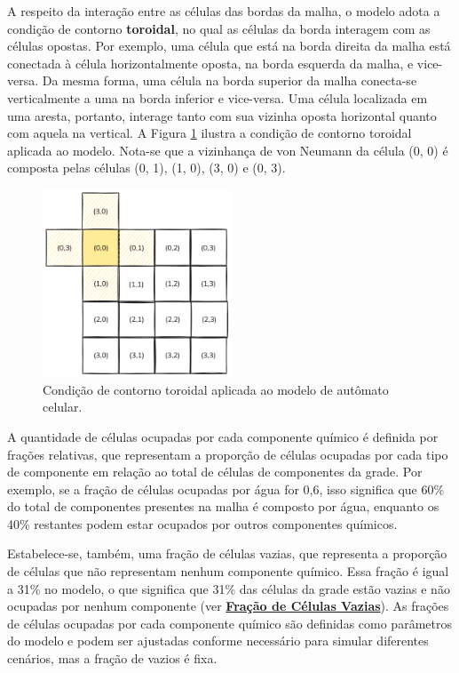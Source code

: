 \documentclass[12pt,oneside]{report}
\begin{document}
A respeito da interação entre as células das bordas da malha, o modelo adota a condição de contorno \textbf{toroidal}, no qual as células da borda interagem com as células opostas. Por exemplo, uma célula que está na borda direita da malha está conectada à célula horizontalmente oposta, na borda esquerda da malha, e vice-versa. Da mesma forma, uma célula na borda superior da malha conecta-se verticalmente a uma na borda inferior e vice-versa. Uma célula localizada em uma aresta, portanto, interage tanto com sua vizinha oposta horizontal quanto com aquela na vertical. A Figura \ref{fig:torus} ilustra a condição de contorno toroidal aplicada ao modelo. Nota-se que a vizinhança de von Neumann da célula (0, 0) é composta pelas células (0, 1), (1, 0), (3, 0) e (0, 3).

\begin{figure}[H]
    \centering
    \includegraphics[width=0.5\textwidth]{torus.png}
    \caption{\small Condição de contorno toroidal aplicada ao modelo de autômato celular.}
    \label{fig:torus}
\end{figure}

A quantidade de células ocupadas por cada componente químico é definida por frações relativas, que representam a proporção de células ocupadas por cada tipo de componente em relação ao total de células de componentes da grade. Por exemplo, se a fração de células ocupadas por água for 0,6, isso significa que 60\% do total de componentes presentes na malha é composto por água, enquanto os 40\% restantes podem estar ocupados por outros componentes químicos.

Estabelece-se, também, uma fração de células vazias, que representa a proporção de células que não representam nenhum componente químico. Essa fração é igual a 31\% no modelo, o que significa que 31\% das células da grade estão vazias e não ocupadas por nenhum componente (ver \hyperref[subsubsec:fracao_celulas_vazias]{\textbf{Fração de Células Vazias}}). As frações de células ocupadas por cada componente químico são definidas como parâmetros do modelo e podem ser ajustadas conforme necessário para simular diferentes cenários, mas a fração de vazios é fixa.
\end{document}
